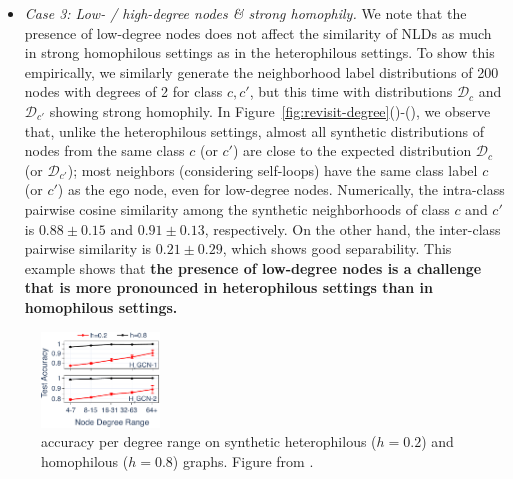 \begin{itemize}
\item \textit{Case 3: Low- / high-degree nodes \& strong homophily.}
We note that the presence of low-degree nodes does not affect the similarity of NLDs as much in strong homophilous settings as in the heterophilous settings. 
To show this empirically, we similarly generate the neighborhood label distributions of 200 nodes with degrees of 2 for class $c, c'$, but this time with distributions $\mathcal{D}_c$ and $\mathcal{D}_{c'}$ showing strong homophily. 
In Figure~\ref{fig:revisit-degree}()-(), we observe that, unlike the heterophilous settings, almost all synthetic distributions of nodes from the same class $c$ (or $c'$) are close to the expected distribution $\mathcal{D}_c$ (or $\mathcal{D}_{c'}$); most neighbors (considering self-loops) have the same class label $c$ (or $c'$) as the ego node, even for low-degree nodes. 
Numerically, the intra-class pairwise cosine similarity among the synthetic neighborhoods of class $c$ and $c'$ is $0.88\pm0.15$ and $0.91\pm0.13$, respectively. On the other hand, the inter-class pairwise similarity is $0.21\pm0.29$, which shows good separability. 
This example shows that 
\textbf{the presence of low-degree nodes is a challenge that is more pronounced in heterophilous settings than in homophilous settings.}
\end{itemize}

\begin{figure}
    \centering
    \includegraphics[width=0.28\textwidth]{submissions/Jiong2023/FIG/revisiting-heterophily-GNNs/deg_acc_h2gcn.pdf}
    \caption{\method accuracy per degree range on synthetic heterophilous ($h=0.2$) and homophilous ($h=0.8$) graphs. Figure from \cite{zhu2020beyond}.}
    \label{fig:h2gcn-degree-acc}
\end{figure}
